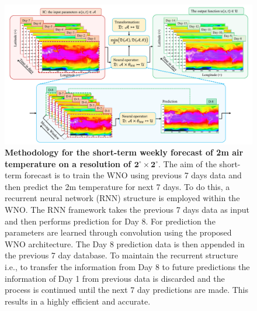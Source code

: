 \documentclass{article}
\begin{document}
\begin{figure}[ht!]
	\centering
	\includegraphics[width=\textwidth]{climate.pdf}
	\caption{\textbf{Methodology for the short-term weekly forecast of 2m air temperature on a resolution of ${\mathbf{2^{\circ} \times 2^{\circ}}}$}. The aim of the short-term forecast is to train the WNO using previous 7 days data and then predict the 2m temperature for next 7 days. To do this, a recurrent neural network (RNN) structure is employed within the WNO. The RNN framework takes the previous 7 days data as input and then performs prediction for Day 8. For prediction the parameters are learned through convolution using the proposed WNO architecture. The Day 8 prediction data is then appended in the previous 7 day database. To maintain the recurrent structure i.e., to transfer the information from Day 8 to future predictions the information of Day 1 from previous data is discarded and the process is continued until the next 7 day predictions are made. This results in a highly efficient and accurate.}
	\label{fig_era5_climate}
\end{figure}
\end{document}
